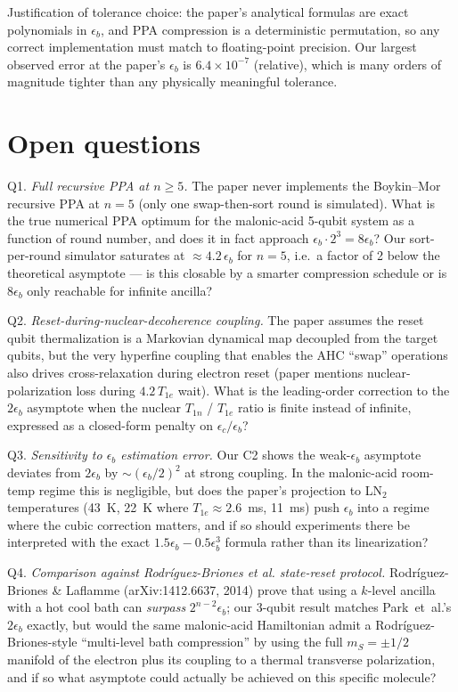 \documentclass[11pt]{article}
\begin{document}
Justification of tolerance choice: the paper's analytical formulas are exact
polynomials in $\epsilon_b$, and PPA compression is a deterministic
permutation, so any correct implementation must match to floating-point
precision. Our largest observed error at the paper's $\epsilon_b$ is
$6.4\times 10^{-7}$ (relative), which is many orders of magnitude tighter
than any physically meaningful tolerance.

\section{Open questions}

Q1. \emph{Full recursive PPA at $n\geq 5$.} The paper never implements the
Boykin--Mor recursive PPA at $n=5$ (only one swap-then-sort round is
simulated). What is the true numerical PPA optimum for the malonic-acid
5-qubit system as a function of round number, and does it in fact approach
$\epsilon_b \cdot 2^{3} = 8\epsilon_b$? Our sort-per-round simulator saturates
at $\approx 4.2\,\epsilon_b$ for $n=5$, i.e.\ a factor of 2 below the
theoretical asymptote --- is this closable by a smarter compression schedule
or is 8$\epsilon_b$ only reachable for infinite ancilla?

Q2. \emph{Reset-during-nuclear-decoherence coupling.} The paper assumes the
reset qubit thermalization is a Markovian dynamical map decoupled from the
target qubits, but the very hyperfine coupling that enables the AHC ``swap''
operations also drives cross-relaxation during electron reset (paper mentions
nuclear-polarization loss during $4.2\,T_{1e}$ wait). What is the leading-order
correction to the $2\epsilon_b$ asymptote when the nuclear $T_{1n}$ / $T_{1e}$
ratio is finite instead of infinite, expressed as a closed-form penalty on
$\epsilon_c/\epsilon_b$?

Q3. \emph{Sensitivity to $\epsilon_b$ estimation error.} Our C2 shows the
weak-$\epsilon_b$ asymptote deviates from $2\epsilon_b$ by
$\sim (\epsilon_b/2)^2$ at strong coupling. In the malonic-acid room-temp
regime this is negligible, but does the paper's projection to LN$_2$
temperatures (43~K, 22~K where $T_{1e}\approx 2.6$~ms, 11~ms) push
$\epsilon_b$ into a regime where the cubic correction matters, and if so
should experiments there be interpreted with the exact
$1.5\epsilon_b - 0.5\epsilon_b^3$ formula rather than its linearization?

Q4. \emph{Comparison against Rodr\'iguez-Briones \emph{et al.} state-reset
protocol.} Rodr\'iguez-Briones \& Laflamme (arXiv:1412.6637, 2014) prove that
using a $k$-level ancilla with a hot cool bath can \emph{surpass}
$2^{n-2}\epsilon_b$; our 3-qubit result matches Park~et~al.'s $2\epsilon_b$
exactly, but would the same malonic-acid Hamiltonian admit a
Rodr\'iguez-Briones-style ``multi-level bath compression'' by using the full
$m_S=\pm 1/2$ manifold of the electron plus its coupling to a thermal
transverse polarization, and if so what asymptote could actually be
achieved on this specific molecule?
\end{document}
